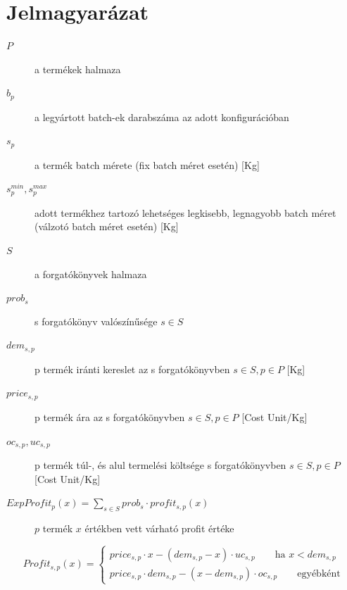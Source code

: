 \appendix
\chapter{Jelmagyarázat} \label{legend}
\begin{description}
\item[$P$]  a termékek halmaza
\item[$b_p$]  a legyártott batch-ek darabszáma az adott konfigurációban
\item[$s_p$]  a termék batch mérete (fix batch méret esetén) [Kg]
\item[$s_p^{min},s_p^{max}$]  adott termékhez tartozó lehetséges legkisebb, legnagyobb batch méret (válzotó batch méret esetén) [Kg]
\item[$S$]  a forgatókönyvek halmaza
\item[$prob_s$]  s forgatókönyv valószínűsége $s	\in S$
\item[$dem_{s,p}$]  p termék iránti kereslet az s forgatókönyvben $s	\in S, p	\in P$ [Kg]
\item[$price_{s,p}$]  p termék ára az s forgatókönyvben $s	\in S, p	\in P$ [Cost Unit/Kg]
\item[$oc_{s,p}, uc_{s,p}$]  p termék túl-, és alul termelési költsége s forgatókönyvben $s	\in S, p	\in P$ [Cost Unit/Kg]
\item[$ExpProfit_p(x)=\sum_{s \in S}prob_s \cdot profit_{s,p}(x)$]  $p$ termék $x$ értékben vett várható profit értéke
\end {description}
\begin{equation*}
Profit_{s,p}(x)= \begin{cases}
            price_{s,p}\cdot x-(dem_{s,p}-x) \cdot uc_{s,p}\qquad \text{ha } x<dem_{s,p} \\
            price_{s,p} \cdot dem_{s,p}-(x-dem_{s,p}) \cdot oc_{s,p}\qquad \text{egyébként}
       \end{cases}
\end{equation*}

